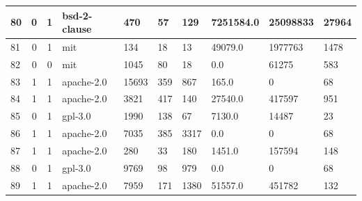 \begin{landscape}
\begin{table}[]
{\begin{tabular}{lcclllllll}
                80  & 0                          & 1                     & bsd-2-clause     & 470              & 57                    & 129                          & 7251584.0       & 25098833           & 27964               \\ \hline
                81  & 0                          & 1                     & mit              & 134              & 18                    & 13                           & 49079.0         & 1977763            & 1478                \\ \hline
                82  & 0                          & 0                     & mit              & 1045             & 80                    & 18                           & 0.0             & 61275              & 583                 \\ \hline
                83  & 1                          & 1                     & apache-2.0       & 15693            & 359                   & 867                          & 165.0           & 0                  & 68                  \\ \hline
                84  & 1                          & 1                     & apache-2.0       & 3821             & 417                   & 140                          & 27540.0         & 417597             & 951                 \\ \hline
                85  & 0                          & 1                     & gpl-3.0          & 1990             & 138                   & 67                           & 7130.0          & 14487              & 23                  \\ \hline
                86  & 1                          & 1                     & apache-2.0       & 7035             & 385                   & 3317                         & 0.0             & 0                  & 68                  \\ \hline
                87  & 1                          & 1                     & apache-2.0       & 280              & 33                    & 180                          & 1451.0          & 157594             & 148                 \\ \hline
                88  & 0                          & 1                     & gpl-3.0          & 9769             & 98                    & 979                          & 0.0             & 0                  & 68                  \\ \hline
                89  & 1                          & 1                     & apache-2.0       & 7959             & 171                   & 1380                         & 51557.0         & 451782             & 132                 \\ \hline

\end{tabular}}
\end{table}
\end{landscape}
